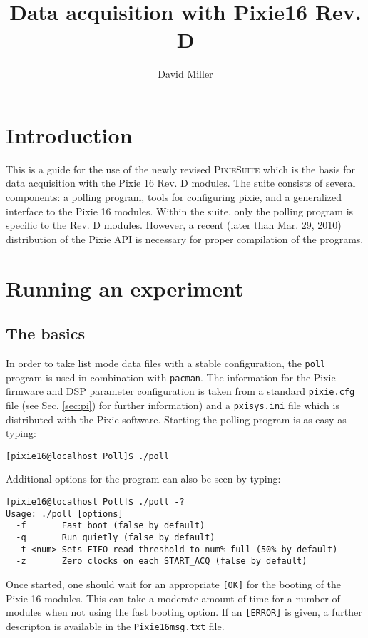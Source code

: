 \documentclass{article}
\title{Data acquisition with Pixie16 Rev. D}
\author{David Miller}
\newcommand{\okay}{\texttt{[OK]}}
\newcommand{\error}{\texttt{[ERROR]}}
\begin{document}
\maketitle
\setcounter{tocdepth}{1}
\tableofcontents
\section{Introduction}
This is a guide for the use of the newly revised \textsc{PixieSuite} which is the basis for data acquisition with the Pixie 16 Rev. D modules. The suite consists of several components: a polling program, tools for configuring pixie, and a generalized interface to the Pixie 16 modules. Within the suite, only the polling program is specific to the Rev. D modules. However, a recent (later than Mar. 29, 2010) distribution of the Pixie API is necessary for proper compilation of the programs.
\section{Running an experiment}
\subsection{The basics}
In order to take list mode data files with a stable configuration, the \texttt{poll} program is used in combination with \texttt{pacman}. The information for the Pixie firmware and DSP parameter configuration is taken from a standard \texttt{pixie.cfg} file (see Sec. \ref{sec:pi}) for further information) and a \texttt{pxisys.ini} file which is distributed with the Pixie software. Starting the polling program is as easy as typing:
\begin{verbatim}
[pixie16@localhost Poll]$ ./poll
\end{verbatim}
Additional options for the program can also be seen by typing:
\begin{verbatim}
[pixie16@localhost Poll]$ ./poll -?
Usage: ./poll [options]
  -f       Fast boot (false by default)
  -q       Run quietly (false by default)
  -t <num> Sets FIFO read threshold to num% full (50% by default)
  -z       Zero clocks on each START_ACQ (false by default)
\end{verbatim}
Once started, one should wait for an appropriate \okay{} for the booting of the Pixie 16 modules. This can take a moderate amount of time for a number of modules when not using the fast booting option. If an \error{} is given, a further descripton is available in the \texttt{Pixie16msg.txt} file.
\end{document}
